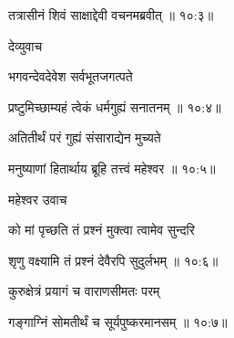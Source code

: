 
{\devanagarifont तत्रासीनं शिवं साक्षाद्देवी वचनमब्रवीत् {॥ १०:३॥} \veg\dontdisplaylinenum }%
 
{\devanagarifont देव्युवाच {\dandab}\dontdisplaylinenum  }%
 
{\devanagarifont भगवन्देवदेवेश सर्वभूतजगत्पते \thinspace{\danda} \dontdisplaylinenum }%


{\devanagarifont प्रष्टुमिच्छाम्यहं त्वेकं धर्मगुह्यं सनातनम् {॥ १०:४॥} \veg\dontdisplaylinenum }%

{\devanagarifont अतितीर्थं परं गुह्यं संसाराद्येन मुच्यते \thinspace{\dandab} \dontdisplaylinenum }%


{\devanagarifont मनुष्याणां हितार्थाय ब्रूहि तत्त्वं महेश्वर {॥ १०:५॥} \veg\dontdisplaylinenum }%

{\devanagarifont महेश्वर उवाच {\dandab}\dontdisplaylinenum  }%
 
{\devanagarifont को मां पृच्छति तं प्रश्नं मुक्त्वा त्वामेव सुन्दरि \thinspace{\danda} \dontdisplaylinenum }%


{\devanagarifont शृणु वक्ष्यामि तं प्रश्नं देवैरपि सुदुर्लभम् {॥ १०:६॥} \veg\dontdisplaylinenum }%

{\devanagarifont कुरुक्षेत्रं प्रयागं च वाराणसीमतः परम् \thinspace{\dandab} \dontdisplaylinenum }%
 

{\devanagarifont गङ्गाग्निं सोमतीर्थं च सूर्यपुष्करमानसम् {॥ १०:७॥} \veg\dontdisplaylinenum }%

